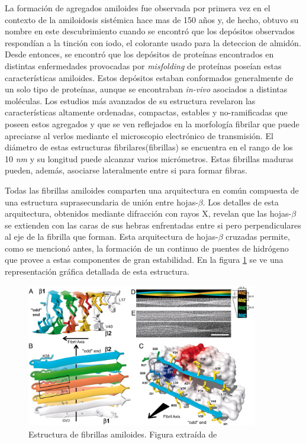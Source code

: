 La formación de agregados amiloides fue observada por primera vez en el contexto de la amiloidosis sistémica hace mas de 150 años y, de hecho, obtuvo su nombre en este descubrimiento cuando se encontró que 
los depósitos observados respondían a la tinción con iodo, el colorante usado para la deteccion de almidón. 
Desde entonces, se encontró que los depósitos de proteínas encontrados en distintas enfermedades provocadas por \textit{misfolding} de proteínas poseían estas características amiloides.
Estos depósitos estaban conformados generalmente de un solo tipo de proteínas, aunque se encontraban \textit{in-vivo} asociados a distintas moléculas.
Los estudios más avanzados de su estructura revelaron las características altamente ordenadas, compactas, estables y no-ramificadas que poseen estos agregados y que se ven reflejados en
la morfología fibrilar que puede apreciarse al verlos mediante el microscopio electrónico de transmisión.
El diámetro de estas estructuras fibrilares(fibrillas) se encuentra en el rango de los 10 \textit{nm} y su longitud puede alcanzar varios micrómetros. 
Estas fibrillas maduras pueden, además, asociarse lateralmente entre si para formar fibras.

Todas las fibrillas amiloides comparten una arquitectura en común compuesta de una estructura suprasecundaria de unión entre hojas-$\beta$.
Los detalles de esta arquitectura, obtenidos mediante difracción con rayos X, revelan que 
las hojas-$\beta$ se extienden con las caras de sus hebras enfrentadas entre si pero perpendiculares al eje de la fibrilla que forman\cite{nelson2005structure}.  
Esta arquitectura de hojas-$\beta$ cruzadas permite, como se mencionó antes, la formación de un continuo de puentes de hidrógeno que provee a estas componentes de gran estabilidad. 
En la figura \ref{amyloidStructure} se ve una representación gráfica detallada de esta estructura.



\begin{figure}[ht]
\centering
\includegraphics[width=0.9\textwidth]{img/amyloidStructure.jpg} 
\caption{Estructura de fibrillas amiloides. Figura extraída de \cite{luhrs20053d}}
\label{amyloidStructure}
\end{figure}



